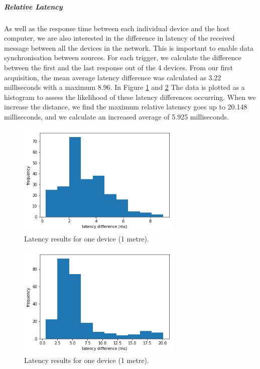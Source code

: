 \subparagraph{Relative Latency}

As well as the response time between each individual device and the host computer, we are also interested in the difference in latency of the received message between all the devices in the network. This is important to enable data synchronisation between sources. For each trigger, we calculate the difference between the first and the last response out of the 4 devices. From our first acquisition, the mean average latency difference was calculated as 3.22 milliseconds with a maximum 8.96. In Figure \ref{fig:latency_fig6} and \ref{fig:latency_fig7} The data is plotted as a histogram to assess the likelihood of these latency differences occurring. When we increase the distance, we find the maximum relative latenscy goes up to 20.148 milliseconds, and we calculate an increased average of 5.925 milliseconds.

\begin{figure}[htbp]
  \centering
    \includegraphics[width=0.7\textwidth]{Chapters/Figures/technical/Latency/figure6.png}
    \caption{Latency results for one device (1 metre).}
    \label{fig:latency_fig6}
\end{figure}

\begin{figure}[htbp]
  \centering
    \includegraphics[width=0.7\textwidth]{Chapters/Figures/technical/Latency/figure7.png}
    \caption{Latency results for one device (1 metre).}
    \label{fig:latency_fig7}
\end{figure}

